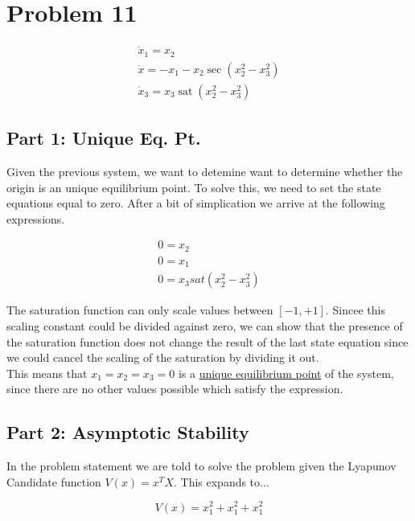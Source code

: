 \section*{Problem 11}



$$
\begin{array}{l}
\dot{x}_{1}=x_{2} \\
\dot{x}=-x_{1}-x_{2} \sec \left(x_{2}^{2}-x_{3}^{2}\right) \\
\dot{x}_{3}=x_{3} \operatorname{sat}\left(x_{2}^{2}-x_{3}^{2}\right)
\end{array}
$$


\subsection*{Part 1: Unique Eq. Pt.}

Given the previous system, we want to detemine want to determine whether the origin is an unique equilibrium point. To solve this, we need to set the state equations equal to zero. After a bit of simplication we arrive at the following expressions.


$$
\begin{array}{l}
0=x_{2} \\
0=x_{1} \\
0=x_{3} sat(x_2^2 - x_3^2)
\end{array}
$$


\noindent The saturation function can only scale values between $[-1, +1]$. Sincee this scaling constant could be divided against zero, we can show that the presence of the saturation function does not change the result of the last state equation since we could cancel the scaling of the saturation by dividing it out. \\

\noindent This means that $x_1 = x_2 = x_3 =0 $ is a \underline{unique equilibrium point} of the system, since there are no other values possible which satisfy the expression.






\subsection*{Part 2: Asymptotic Stability}

In the problem statement we are told to solve the problem given the Lyapunov Candidate function $V(x) = x^TX$. This expands to...

$$
V(x) = x_1^2 + x_1^2 + x_1^2
$$

